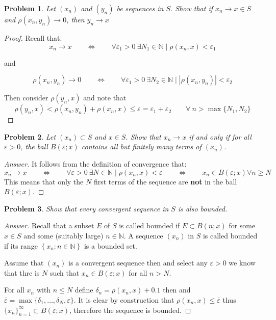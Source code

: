 \documentclass{article}
\newtheorem{problem}{Problem}
\newcommand{\qiffq}{\qquad \iff \qquad}
\begin{document}
\begin{problem}
    Let $\left(x_{n}\right)$ and $\left(y_{n}\right)$ be sequences in $S$. Show that if $x_{n} \rightarrow x \in S$ and $\rho\left(x_{n}, y_{n}\right) \rightarrow 0$, then $y_{n} \rightarrow x$
\end{problem}

\begin{proof}
    Recall that:
    $$x_n \to x \qiffq \forall\varepsilon_1 > 0 \: \exists N_1\in \mathbb{N} \mid \rho(x_n,x)< \varepsilon_1$$

    and 

    $$\rho(x_n,y_n) \to 0 \qiffq \forall\varepsilon_1 > 0 \: \exists N_2\in \mathbb{N} \mid |\rho(x_n,y_n)|< \varepsilon_2$$

    Then consider $\rho(y_n,x)$ and note that
    $$\rho(y_n,x)<\rho(x_n,y_n) + \rho(x_n,x) \leq \varepsilon = \varepsilon_1 + \varepsilon_2 \qquad \forall \:n > \max\{N_1,N_2\}$$
\end{proof}

\begin{problem}
    Let $\left(x_{n}\right) \subset S$ and $x \in S$. Show that $x_{n} \rightarrow x$ if and only if for all $\varepsilon>0$, the ball $B(\varepsilon ; x)$ contains all but finitely many terms of $\left(x_{n}\right)$.
\end{problem}

\begin{proof}[Answer]
    It follows from the definition of convergence that:
    $$x_n \to x \qiffq \forall \varepsilon > 0 \: \exists N \in \mathbb{N} \mid \rho(x_n,x)< \varepsilon \qiffq x_n \in B(\varepsilon; x) \forall n \geq N$$
    This means that only the $N$ first terms of the sequence are \textbf{not} in the ball $B(\varepsilon;x)$.
\end{proof}

\begin{problem}
    Show that every convergent sequence in $S$ is also bounded.
\end{problem}

\begin{proof}[Answer]
    Recall that a subset $E$ of $S$ is called bounded if $E \subset B(n ; x)$ for some $x \in S$ and some (suitably large) $n \in \mathbb{N}$. A sequence $\left(x_{n}\right)$ in $S$ is called bounded if its range $\left\{x_{n}: n \in \mathbb{N}\right\}$ is a bounded set.

    Assume that $(x_n)$ is a convergent sequence then and select any $\varepsilon>0$ we know that thre is $N$ such that $x_n\in B(\varepsilon; x)$ for all $n>N$.

    For all $x_n$ with $n\leq N$ define $\delta_n = \rho(x_n, x) + 0.1$ then and $\bar{\varepsilon} = \max\{\delta_1,\ldots,\delta_N,\varepsilon\}$. It is clear by construction that $\rho(x_n,x)\leq \bar{\varepsilon}$ thus $\{x_n\}_{n=1}^\infty \subset B(\bar{\varepsilon; x})$, therefore the sequence is bounded.
\end{proof}
\end{document}
